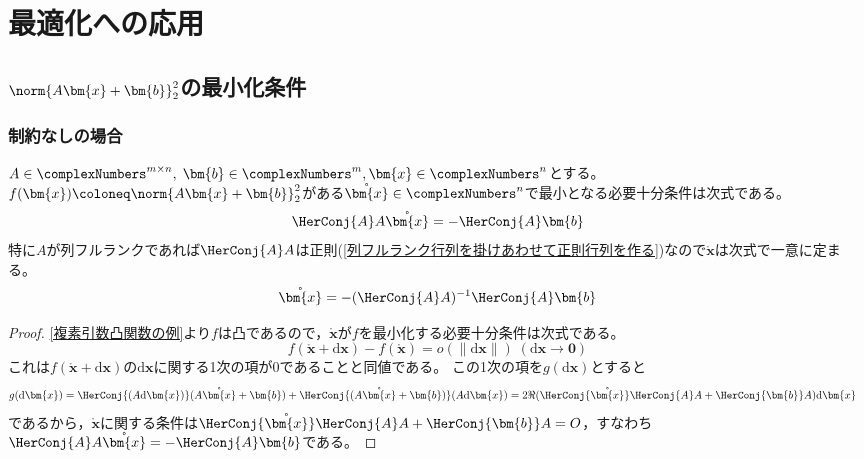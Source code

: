 \chapter{最適化への応用}
    \section{\texorpdfstring{$\norm{A\bm{x} + \bm{b}}_2^2$}{||Ax+b||\_2}の最小化条件}
        \subsection{制約なしの場合}
            \begin{shadebox}
                $A\in\complexNumbers^{m\times n},\;\bm{b} \in \complexNumbers^m, \bm{x} \in \complexNumbers^n$とする。
                $f(\bm{x}) \coloneq \norm{A\bm{x} + \bm{b}}_2^2$がある$\mathring{\bm{x}} \in \complexNumbers^n$で最小となる必要十分条件は次式である。
                \[ \HerConj{A}A\mathring{\bm{x}} = -\HerConj{A}\bm{b} \]
                特に$A$が列フルランクであれば$\HerConj{A}A$は正則(\ref{列フルランク行列を掛けあわせて正則行列を作る})なので$\mathring{\bm{x}}$は次式で一意に定まる。
                \[ \mathring{\bm{x}} = -(\HerConj{A}A)^{-1}\HerConj{A}\bm{b} \]
            \end{shadebox}
            \begin{proof}
                \quad\par
                \ref{複素引数凸関数の例}より$f$は凸であるので，$\mathring{\bm{x}}$が$f$を最小化する必要十分条件は次式である。
                \[ f(\mathring{\bm{x}} + \mathrm{d}\bm{x}) - f(\mathring{\bm{x}}) = o(\|\mathrm{d}\bm{x}\|) \; (\mathrm{d}\bm{x} \to \bm{0}) \]
                これは$f(\mathring{\bm{x}} + \mathrm{d}\bm{x})$の$\mathrm{d}\bm{x}$に関する1次の項が0であることと同値である。
                この1次の項を$g(\mathrm{d}\bm{x})$とすると
                \begin{align*}
                    g(\mathrm{d}\bm{x}) &= \HerConj{(A\mathrm{d}\bm{x})}(A\mathring{\bm{x}} + \bm{b}) + \HerConj{(A\mathring{\bm{x}} + \bm{b})}(A\mathrm{d}\bm{x}) = 2\Re{(\HerConj{\mathring{\bm{x}}}\HerConj{A}A + \HerConj{\bm{b}}A)\mathrm{d}\bm{x}}
                \end{align*}
                であるから，$\mathring{\bm{x}}$に関する条件は$\HerConj{\mathring{\bm{x}}}\HerConj{A}A + \HerConj{\bm{b}}A = O$，すなわち$\HerConj{A}A\mathring{\bm{x}} = -\HerConj{A}\bm{b}$である。
            \end{proof}
